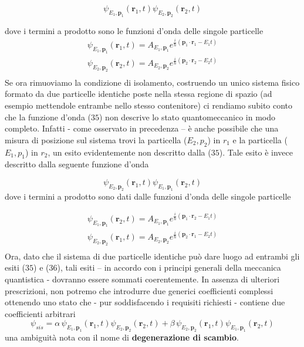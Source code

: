\begin{equation}
	\psi_{E_{1},\mathbf{p}_{1}}(\mathbf{r}_{1},t) \psi_{E_{2},\mathbf{p}_{2}}(\mathbf{r}_{2},t)
\end{equation}

dove i termini a prodotto sono le funzioni d'onda delle singole
particelle \begin{gather*}
	\psi_{E_{1},\mathbf{p}_{1}}(\mathbf{r}_{1},t) = A_{E_{1},\mathbf{p}_{1}}e^{ \frac{i}{\hbar} (\mathbf{p}_{1} \cdot \mathbf{r}_{1}-E_{1}t)}\\
	\psi_{E_{2},\mathbf{p}_{2}}(\mathbf{r}_{2},t) = A_{E_{2},\mathbf{p}_{2}}e^{ \frac{i}{\hbar} (\mathbf{p}_{2} \cdot \mathbf{r}_{2}-E_{2}t)}\\
\end{gather*} Se ora rimuoviamo la condizione di isolamento, costruendo un unico
sistema fisico formato da due particelle identiche poste nella stessa
regione di spazio (ad esempio mettendole entrambe nello stesso
contenitore) ci rendiamo subito conto che la funzione d'onda (\(35\))
non descrive lo stato quantomeccanico in modo completo.
Infatti - come
osservato in precedenza -- è anche possibile che una misura di posizione
sul sistema trovi la particella (\(E_{2},p_{2}\)) in \(r_{1}\) e la
particella (\(E_{1},p_{1}\)) in \(r_{2}\), un esito evidentemente non
descritto dalla (\(35\)).
Tale esito è invece descritto dalla seguente
funzione d'onda

\begin{equation}
	\psi_{E_{2},\mathbf{p}_{2}}(\mathbf{r}_{1},t) \psi_{E_{1},\mathbf{p}_{1}}(\mathbf{r}_{2},t)
\end{equation} dove i termini a prodotto sono dati dalle funzioni d'onda
delle singole particelle

\begin{gather*}
	\psi_{E_{1},\mathbf{p}_{1}}(\mathbf{r}_{2},t) = A_{E_{1},\mathbf{p}_{1}}e^{ \frac{i}{\hbar} (\mathbf{p}_{1} \cdot \mathbf{r}_{2}-E_{1}t)}\\
	\psi_{E_{2},\mathbf{p}_{2}}(\mathbf{r}_{1},t) = A_{E_{2},\mathbf{p}_{2}}e^{ \frac{i}{\hbar} (\mathbf{p}_{2} \cdot \mathbf{r}_{1}-E_{2}t)}\\
\end{gather*}
Ora, dato che il sistema di due particelle identiche può dare luogo
ad entrambi gli esiti (\(35\)) e (\(36\)), tali esiti -- in accordo con
i principi generali della meccanica quantistica - dovranno essere
sommati coerentemente.
In assenza di ulteriori prescrizioni, non potremo
che introdurre due generici coefficienti complessi ottenendo uno stato
che - pur soddisfacendo i requisiti richiesti - contiene due
coefficienti arbitrari
\[
	\psi_{sis} = \alpha \, \psi_{E_{1},\mathbf{p}_{1}}(\mathbf{r}_{1},t) \psi_{E_{2},\mathbf{p}_{2}}(\mathbf{r}_{2},t) +
	\beta \, \psi_{E_{2},\mathbf{p}_{2}}(\mathbf{r}_{1},t) \psi_{E_{1},\mathbf{p}_{1}}(\mathbf{r}_{2},t)
\]
una ambiguità nota con il nome di \textbf{degenerazione di scambio}.

